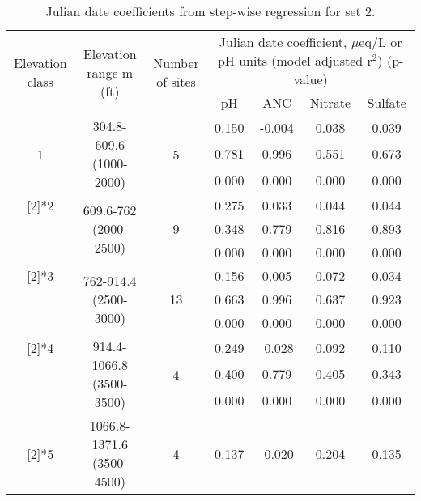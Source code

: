 \begin{table}[htbp]
  \centering
  \caption{Julian date coefficients from step-wise regression for set 2.}
    \begin{tabular}{ccccccc}
    \toprule
    \multirow{3}[4]{2cm}{Elevation class} & \multirow{3}[4]{2.5cm}{Elevation range m (ft)} & \multirow{3}[4]{2cm}{Number of sites} & \multicolumn{4}{c}{\multirow{2}[2]{7cm}{Julian date coefficient, $\mu$eq/L or pH units (model adjusted r$^2$) (p-value)}} \\
          &       &       & \multicolumn{4}{c}{}\bigstrut\\\cline{4-7}\noalign{\smallskip}
          &       &       & pH    & ANC   & Nitrate & Sulfate \\
\midrule
    \multirow{3}[2]{*}{1} & \multirow{3}[2]{2.5cm}{304.8-609.6 (1000-2000)} & \multirow{3}[2]{*}{5} & 0.150  & -0.004  & 0.038  & 0.039  \\
          &       &       & 0.781  & 0.996  & 0.551  & 0.673  \\
          &       &       & 0.000  & 0.000  & 0.000  & 0.000  \bigstrut\\\cline{4-7}\noalign{\smallskip}
    \multirow{3}[2]{*}{2} & \multirow{3}[2]{2.5cm}{609.6-762 (2000-2500)} & \multirow{3}[2]{*}{9} & 0.275  & 0.033  & 0.044  & 0.044  \\
          &       &       & 0.348  & 0.779  & 0.816  & 0.893  \\
          &       &       & 0.000  & 0.000  & 0.000  & 0.000  \bigstrut\\\cline{4-7}\noalign{\smallskip}
    \multirow{3}[2]{*}{3} & \multirow{3}[2]{2.5cm}{762-914.4 (2500-3000)} & \multirow{3}[2]{*}{13} & 0.156  & 0.005  & 0.072  & 0.034  \\
          &       &       & 0.663  & 0.996  & 0.637  & 0.923  \\
          &       &       & 0.000  & 0.000  & 0.000  & 0.000  \bigstrut\\\cline{4-7}\noalign{\smallskip}
    \multirow{3}[2]{*}{4} & \multirow{3}[2]{2.5cm}{914.4-1066.8 (3500-3500)} & \multirow{3}[2]{*}{4} & 0.249  & -0.028  & 0.092  & 0.110  \\
          &       &       & 0.400  & 0.779  & 0.405  & 0.343  \\
          &       &       & 0.000  & 0.000  & 0.000  & 0.000  \bigstrut\\\cline{4-7}\noalign{\smallskip}
    \multirow{3}[2]{*}{5} & \multirow{3}[2]{2.5cm}{1066.8-1371.6 (3500-4500)} & \multirow{3}[2]{*}{4} & 0.137  & -0.020  & 0.204  & 0.135  \\

\end{tabular}
\end{table}
